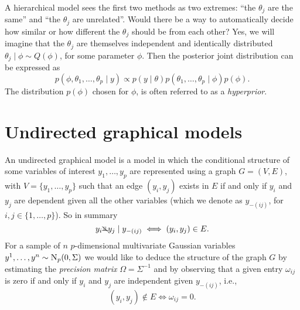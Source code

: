 \documentclass[a4paper, 11pt, oneside]{report}
\newcommand{\1}{\mathds{1}}
\newcommand{\inv}{^{-1}}
\newcommand{\Np}{\textsc{N}_p}
\newcommand{\nindep}{{\rotatebox[origin=c]{90}{$\nvDash$}}}
\begin{document}
A hierarchical model sees the first two methods as two
extremes: ``the $\theta_j$ are the same'' and ``the $\theta_j$ are unrelated''.
Would there be a way to automatically decide how similar or how different the $\theta_j$ should be from each other?
Yes, we will imagine that the $\theta_j$ are themselves independent and identically distributed
$\theta_j \mid \phi \sim Q(\phi)$, for some parameter $\phi$. Then the posterior
joint distribution can be expressed as
\[p(\phi, \theta_1, \dots, \theta_p \mid y) \propto p(y \mid \theta) p(\theta_1, \dots, \theta_p \mid \phi) p(\phi).\]
The distribution $p(\phi)$ chosen for $\phi$, is often
referred to as a \emph{hyperprior}.

\section{Undirected graphical models}
An undirected graphical model is a model in which the conditional
structure of some variables of interest $y_1, \dots, y_p$ are represented using a
graph $G=(V, E)$, with $V = \{y_1, \dots, y_p\}$ such that an edge $(y_i, y_j)$
exists in $E$ if and only if $y_i$ and $y_j$ are dependent given all the other
variables (which we denote as $y_{-(ij)}$, for $i,j \in \{1,\dots,p\}$). So in summary
\[y_i \nindep y_j \mid y_{-(ij)} \iff (y_i, y_j) \in E.\]
For a sample
of $n$ $p$-dimensional multivariate Gaussian variables $y^1, \dots, y^n \sim
	\Np(0, \Sigma)$ we would like to deduce the structure of the graph $G$ by
estimating the \emph{precision matrix} $\Omega =
	\Sigma\inv$ and by observing that a given entry $\omega_{ij}$ is zero if and only if $y_i$ and $y_j$ are
independent given $y_{-(ij)}$, i.e.,
\[(y_i, y_j) \notin E \iff \omega_{ij} = 0.\]
\end{document}
